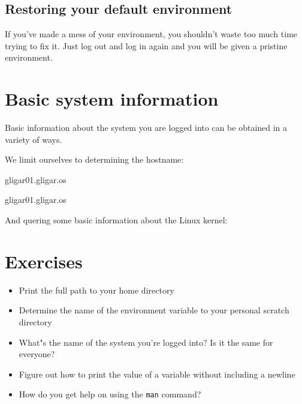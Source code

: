 \subsection{Restoring your default environment}

If you've made a mess of your environment, you shouldn't waste too much time
trying to fix it. Just log out and log in again and you will be given a
pristine environment.

\section{Basic system information}

Basic information about the system you are logged into can be obtained in a variety of ways.

We limit ourselves to determining the hostname:

\begin{prompt}
  gligar01.gligar.os

  gligar01.gligar.os
\end{prompt}

And quering some basic information about the Linux kernel:


\section{Exercises}

\begin{itemize}
    \item Print the full path to your home directory
    \item Determine the name of the environment variable to your personal scratch directory
    \item What"s the name of the system you're logged into? Is it the same for everyone?
    \item Figure out how to print the value of a variable without including a newline
    \item How do you get help on using the \verb|man| command?
\end{itemize}
